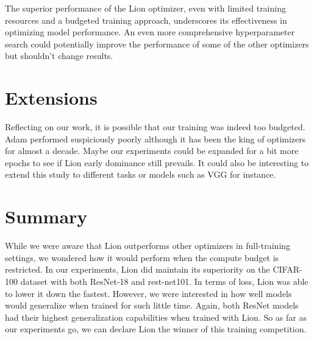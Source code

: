 \documentclass[10pt,conference,compsocconf]{IEEEtran}
\begin{document}
The superior performance of the Lion optimizer, even with limited training resources and a budgeted training approach, underscores its effectiveness in optimizing model performance. An even more comprehensive hyperparameter search could potentially improve the performance of some of the other optimizers but shouldn't change results. 


\section{Extensions}

Reflecting on our work, it is possible that our training was indeed too budgeted. Adam performed suspiciously poorly although it has been the king of optimizers for almost a decade. Maybe our experiments could be expanded for a bit more epochs to see if Lion early dominance still prevails. It could also be interesting to extend this study to different tasks or models such as VGG for instance.

\section{Summary}
While we were aware that Lion outperforms other optimizers in full-training settings, we wondered how it would perform when the compute budget is restricted. In our experiments, Lion did maintain its superiority on the CIFAR-100 dataset with both ResNet-18 and rest-net101. In terms of loss, Lion was able to lower it down the fastest. However, we were interested in how well models would generalize when trained for such little time. Again, both ResNet models had their highest generalization capabilities when trained with Lion. So as far as our experiments go, we can declare Lion the winner of this training competition.




\end{document}
